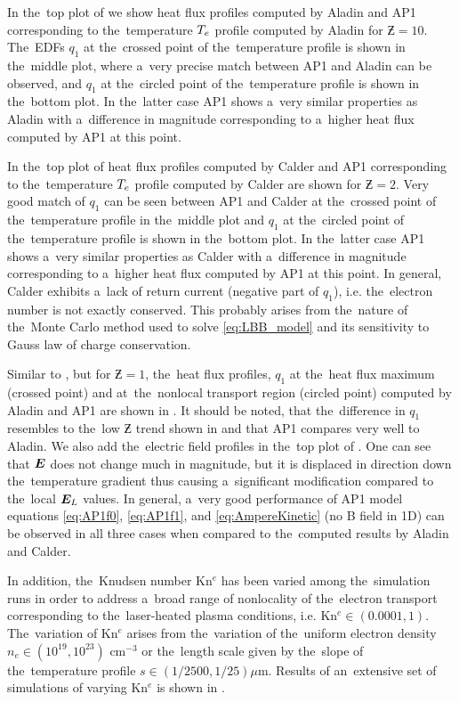 In the~top plot of  we show heat flux profiles
computed by Aladin and AP1 corresponding to the~temperature $T_e$ profile 
computed by Aladin for $\Zbar = 10$. The~EDFs $q_1$ at the~crossed point of 
the~temperature profile is shown in the~middle plot, where a~very precise match
between AP1 and Aladin can be observed, and $q_1$ at the~circled point 
of the~temperature profile is shown in the~bottom plot. In the~latter case
AP1 shows a~very similar properties as Aladin with a~difference in magnitude
corresponding to a~higher heat flux computed by AP1 at this point.

In the~top plot of  heat flux profiles
computed by Calder and AP1 corresponding to the~temperature $T_e$ profile 
computed by Calder are shown for $\Zbar = 2$. 
Very good match of $q_1$ can be seen between 
AP1 and Calder at the~crossed point of the~temperature profile in the~middle 
plot and $q_1$ at the~circled point of the~temperature profile is shown 
in the~bottom plot. In the~latter case AP1 shows a~very similar properties 
as Calder with a~difference in magnitude corresponding to a~higher heat flux 
computed by AP1 at this point. In general, Calder exhibits a~lack of 
return current (negative part of $q_1$), i.e. the~electron number is not 
exactly conserved. This probably arises from the~nature of the~Monte Carlo 
method used to solve \eqref{eq:LBB_model} and its sensitivity to Gauss law
of charge conservation.

Similar to , but for $\Zbar = 1$, 
the~heat flux profiles, $q_1$ at the~heat flux maximum (crossed point) and
at~the~nonlocal transport region (circled point) computed by Aladin and AP1 
are shown in . It should be noted, 
that the~difference in $q_1$ resembles to the~low $\Zbar$ trend
shown in  and that AP1 compares very well
to Aladin. We also add the~electric field profiles
in the~top plot of . 
One can see that $\boldsymbol{E}$ does not change much in magnitude, but
it is displaced in direction down the~temperature gradient thus causing 
a~significant modification compared to the~local $\boldsymbol{E}_L$ values.
In general, a~very good performance of AP1 model equations 
\eqref{eq:AP1f0}, \eqref{eq:AP1f1}, and \eqref{eq:AmpereKinetic} 
(no B field in 1D) can be observed in all three cases when compared
to the~computed results by Aladin and Calder.

In addition, the~Knudsen number Kn$^e$ has been varied among the~simulation 
runs in order to address a~broad range of nonlocality of 
the~electron transport corresponding 
to the~laser-heated plasma conditions, i.e. Kn$^e \in (0.0001, 1)$. 
The~variation of Kn$^e$ arises from the~variation
of the~uniform electron density $n_e \in (10^{19}, 10^{23})$ cm$^{-3}$ or 
the~length scale given by the~slope of the~temperature profile 
$s \in (1/2500, 1/25) \mu$m. Results of an~extensive set of simulations of
varying Kn$^e$ is shown in .
 
